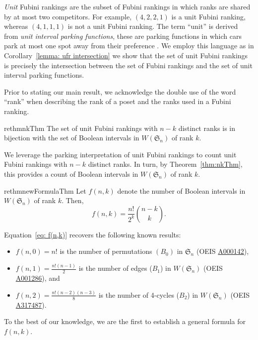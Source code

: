 \documentclass[11pt,reqno]{amsart}
\newcommand{\Sym}{\mathfrak{S}}
\begin{document}
\emph{Unit} Fubini rankings are the subset of Fubini rankings in which ranks are shared by at most two competitors. 
For example, $(4,2,2,1)$ is a unit Fubini ranking, whereas $(4,1,1,1)$ is not a unit Fubini ranking.
The term ``unit'' is derived from \emph{unit interval parking functions}, these are parking functions in which cars park at most one spot away from their preference \cite{hadaway2022combinatorial}. 
We employ this language as in Corollary~\ref{lemma: ufr intersection} we show that the set of unit Fubini rankings is precisely the intersection between the set of Fubini rankings and the set of unit interval parking functions.

Prior to stating our main result, we acknowledge the double use of the word ``rank'' when describing the rank of a poset and the ranks used in a Fubini ranking.

\begin{restatable}{rethm}{nkThm}
\label{thm:nkThm}
The set of unit Fubini rankings with $n-k$ distinct ranks is in bijection with the set of Boolean intervals in $W(\Sym_n)$ of rank $k$.
\end{restatable}

We leverage the parking interpretation of unit Fubini rankings to count unit Fubini rankings with $n-k$ distinct ranks.
In turn, by Theorem~\ref{thm:nkThm}, this provides a count of Boolean intervals in $W(\Sym_n)$ of rank $k$.
\begin{restatable}{rethm}{newFormulaThm}
\label{newFormulaThm}
Let $f(n,k)$ denote the number of Boolean intervals in $W(\Sym_n)$ of rank $k$.
Then,
\begin{equation}
\label{eq: f(n,k)}
    f(n,k) = \frac{n!}{2^k}\binom{n-k}{k}.
\end{equation}
\end{restatable}
Equation~\eqref{eq: f(n,k)} recovers the following known results:
\begin{itemize}
    \item $f(n,0)=n!$ is the number of permutations $(B_0)$ in $\Sym_n$ (OEIS \href{https://oeis.org/A000142}{A000142}), 
    \item $f(n,1)=\frac{n!(n-1)}{2}$ is the number of edges ($B_1$) in $W(\Sym_n)$ (OEIS \href{https://oeis.org/A001286}{A001286}), and 
    \item $f(n,2)=\frac{n!(n-2)(n-3)}{8}$ is the number of 4-cycles ($B_2$) in $W(\Sym_n)$ (OEIS \href{https://oeis.org/A317487}{A317487}).
\end{itemize}  
To the best of our knowledge, we are the first to establish a general formula for $f(n,k)$.
\end{document}
